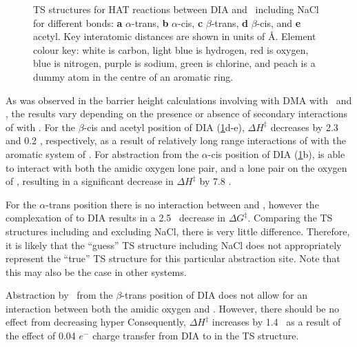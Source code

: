 \begin{figure}\ContinuedFloat

  \caption[TS structures for HAT reaction between DIA and \cumo\ including NaCl.]{TS structures for HAT reactions between DIA and \cumo\ including NaCl for different  bonds: \textbf{a} $\alpha$-trans, \textbf{b} $\alpha$-cis, \textbf{c} $\beta$-trans, \textbf{d} $\beta$-cis, and \textbf{e} acetyl. Key interatomic distances are shown in units of \AA. Element colour key: white is carbon, light blue is hydrogen, red is oxygen, blue is nitrogen, purple is sodium, green is chlorine, and peach is a dummy atom in the centre of an aromatic ring.}
  \label{fig:dia-cumo-ts}
\end{figure}

As was observed in the barrier height calculations involving  with DMA with \bno\ and \cumo, the results vary depending on the presence or absence of secondary interactions of  with \cumo. For the $\beta$-cis and acetyl position of DIA (\ref{fig:dia-cumo-ts}d-e), $\Delta H^\ddagger$ decreases by 2.3 and 0.2 \kcalmol, respectively, as a result of relatively long range interactions of  with the aromatic system of \cumo. For abstraction from the $\alpha$-cis position of DIA (\ref{fig:dia-cumo-ts}b),  is able to interact with both the amidic oxygen lone pair, and a lone pair on the oxygen of \cumo, resulting in a significant decrease in $\Delta H^\ddagger$ by 7.8 \kcalmol.

For the $\alpha$-trans position there is no interaction between  and \cumo, however the complexation of  to DIA results in a 2.5 \kcalmol\ decrease in $\Delta G^\ddagger$. Comparing the TS structures including and excluding NaCl, there is very little difference. Therefore, it is likely that the ``guess'' TS structure including NaCl does not appropriately represent the ``true'' TS structure for this particular abstraction site. Note that this may also be the case in other systems.

Abstraction by \cumo\ from the $\beta$-trans position of DIA does not allow for an interaction between both the amidic oxygen and \cumo. However, there should be no effect from decreasing hyper Consequently, $\Delta H^\ddagger$ increases by 1.4 \kcalmol\ as a result of the effect of 0.04 $e^-$ charge transfer from DIA to  in the TS structure.


